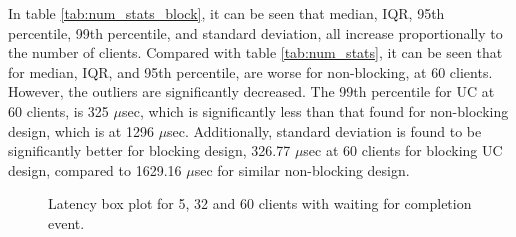 In table \ref{tab:num_stats_block}, it can be seen that median, IQR, 95th percentile, 99th percentile, and standard deviation, all increase proportionally to the number of clients.
Compared with table \ref{tab:num_stats}, it can be seen that for median, IQR, and 95th percentile, are worse for non-blocking, at 60 clients.
However, the outliers are significantly decreased.
The 99th percentile for UC at 60 clients, is 325 $\mu$sec, which is significantly less than that found for non-blocking design, which is at 1296 $\mu$sec.
Additionally, standard deviation is found to be significantly better for blocking design, 326.77 $\mu$sec at 60 clients for blocking UC design, compared to 1629.16 $\mu$sec for similar non-blocking design.

\begin{figure}
    \centering
    \caption[Latency box plot]{Latency box plot for 5, 32 and 60 clients with waiting for completion event.}
    \label{fig:Box_block}
\end{figure}

